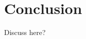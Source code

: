 \documentclass{drl-common/llncs}
\newcommand{\sh}{\text{\textesh}}
\begin{document}
\section{Conclusion}

Discuss \sh{} here?


{ %


}
\end{document}
